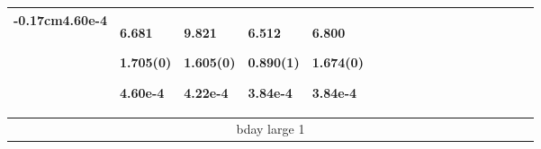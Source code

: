 \begin{longtable}{|p{0.01cm}|p{0.25cm}p{0.25cm}p{0.25cm}p{0.25cm}p{0.25cm}p{0.25cm}p{0.25cm}p{0.25cm}p{0.25cm}p{0.25cm}p{0.25cm}p{0.25cm}p{0.25cm}p{0.25cm}p{0.25cm}p{0.25cm}p{0.25cm}|}
{-0.17cm}4.60e-4}} & \par{\tiny \parbox{1cm}{\hspace{-0.17cm}6.681}}\par{\tiny \parbox{1cm}{\hspace{-0.17cm}1.705(0)}}\par{\tiny \parbox{1cm}{\hspace{-0.17cm}4.60e-4}} & \par{\tiny \parbox{1cm}{\hspace{-0.17cm}9.821}}\par{\tiny \parbox{1cm}{\hspace{-0.17cm}1.605(0)}}\par{\tiny \parbox{1cm}{\hspace{-0.17cm}4.22e-4}} & \par{\tiny \parbox{1cm}{\hspace{-0.17cm}6.512}}\par{\tiny \parbox{1cm}{\hspace{-0.17cm}0.890(1)}}\par{\tiny \parbox{1cm}{\hspace{-0.17cm}3.84e-4}} & \par{\tiny \parbox{1cm}{\hspace{-0.17cm}6.800}}\par{\tiny \parbox{1cm}{\hspace{-0.17cm}1.674(0)}}\par{\tiny \parbox{1cm}{\hspace{-0.17cm}3.84e-4}}\\
\hline\hline \multicolumn{18}{|c|}{\tiny{bday large 1}} \\

\end{longtable}
